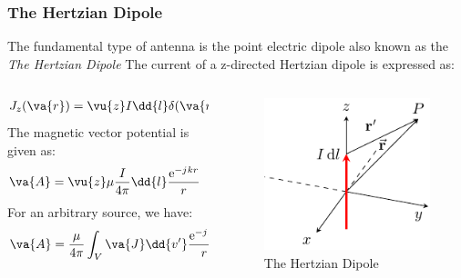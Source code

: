 \documentclass[10pt, compress]{beamer}
\renewcommand{\u}{\mu}  %
\newcommand{\e}{\mathrm{e}} %
\renewcommand{\j}{{j}\mkern1mu} %
\begin{document}
\begin{frame}
  \frametitle{The Hertzian Dipole}
  \begin{outline}
    \1 The fundamental type of antenna is the point electric dipole also known as the \textit{The Hertzian Dipole}
    \1 The current of a z-directed Hertzian dipole is expressed as:
  \end{outline}
  \begin{columns}[T] %
  \begin{column}{.65\textwidth}
  \begin{align*}
    J_z (\va{r}) &= \vu{z} I  \dd{l} \delta(\va{r})
  \end{align*}
  The magnetic vector potential is given as:
  \begin{align*}
    \va{A} &= \vu{z} \u \frac{I}{4 \pi} \dd{l} \frac{\e^{-\j k r}}{r}
  \end{align*}
  For an arbitrary source, we have:
    \begin{align*}
    \va{A} &=   \frac{\u}{4 \pi} \int_{V} \va{J} \dd{v'} \frac{\e^{-\j k r}}{r}
  \end{align*}
   \end{column}
 \begin{column}[T]{.35\textwidth}
    \begin{figure}
      \centering
          \includegraphics[width=.9\textwidth]{VED_above_half_space.pdf}
      \caption{The Hertzian Dipole}
    \end{figure}
      \end{column}%
\end{columns}  
\end{frame}
\end{document}
